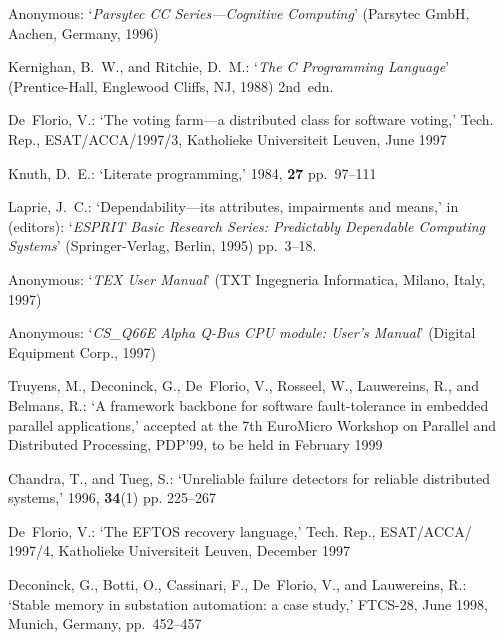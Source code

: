 \documentclass[11pt]{article}
\begin{document}
\begin{thebibliography}{20}
{\sc Anonymous}:
\newblock `{\em Parsytec CC Series---Cognitive Computing}'
\newblock (Parsytec GmbH, Aachen, Germany, 1996)

{\sc Kernighan, B.~W., and Ritchie, D.~M.}:
\newblock `{\em The C Programming Language}'
\newblock (Prentice-Hall, Englewood Cliffs, NJ, 1988) 2nd~edn.

{\sc De~Florio, V.}:
\newblock `The voting farm---a distributed class for software voting,'
\newblock Tech. Rep., ESAT/ACCA/1997/3, Katholieke Universiteit Leuven, June
  1997

{\sc Knuth, D.~E.}:
\newblock `Literate programming,'
 1984, {\bf 27} pp.~97--111

{\sc Laprie, J.~C.}:
\newblock `Dependability---its attributes, impairments and means,'
\newblock in
 (editors):
\newblock `{\em ESPRIT Basic Research Series: Predictably Dependable Computing Systems}'
\newblock (Springer-Verlag, Berlin, 1995) pp.~3--18.

{\sc Anonymous}:
\newblock `{\em TEX User Manual}'
\newblock (TXT Ingegneria Informatica, Milano, Italy, 1997)

{\sc Anonymous}:
\newblock `{\em CS\_Q66E Alpha Q-Bus CPU module: User's Manual}'
\newblock (Digital Equipment Corp., 1997)

{\sc Truyens, M., Deconinck, G., De~Florio, V., Rosseel, W., Lauwereins,
  R., and Belmans, R.}:
\newblock `A framework backbone for software fault-tolerance in
  embedded parallel applications,'
\newblock accepted at the 7th EuroMicro Workshop on Parallel and
  Distributed Processing, PDP'99, to be held in February 1999

{\sc Chandra, T., and Tueg, S.}:
\newblock `Unreliable failure detectors for reliable distributed systems,'
 1996, {\bf 34}(1) pp. 225--267

{\sc De~Florio, V.}:
\newblock `The EFTOS recovery language,'
\newblock Tech. Rep., ESAT/ACCA/ 1997/4, Katholieke Universiteit Leuven, December
  1997

{\sc Deconinck, G., Botti, O., Cassinari, F., De~Florio, V., and Lauwereins,
  R.}:
\newblock `Stable memory in substation automation: a case study,'
  FTCS-28, June 1998, Munich, Germany, pp.~452--457


\end{thebibliography}
\end{document}
